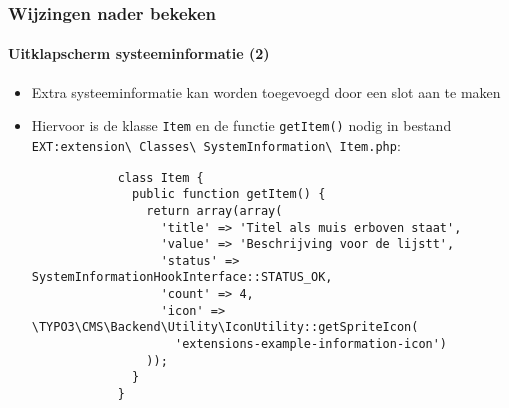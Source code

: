 \begin{frame}[fragile]
	\frametitle{Wijzingen nader bekeken}
	\framesubtitle{Uitklapscherm systeeminformatie (2)}

	\lstset{basicstyle=\tiny\ttfamily}

	\begin{itemize}

		\item Extra systeeminformatie kan worden toegevoegd door een slot aan te maken

		\item Hiervoor is de klasse \texttt{Item} en de functie \texttt{getItem()} nodig in bestand
			\small
				\texttt{EXT:extension\textbackslash
					Classes\textbackslash
					SystemInformation\textbackslash
					Item.php}:
			\normalsize

		\begin{lstlisting}
			class Item {
			  public function getItem() {
			    return array(array(
			      'title' => 'Titel als muis erboven staat',
			      'value' => 'Beschrijving voor de lijstt',
			      'status' => SystemInformationHookInterface::STATUS_OK,
			      'count' => 4,
			      'icon' => \TYPO3\CMS\Backend\Utility\IconUtility::getSpriteIcon(
				    'extensions-example-information-icon')
			    ));
			  }
			}
		\end{lstlisting}

	\end{itemize}

\end{frame}

